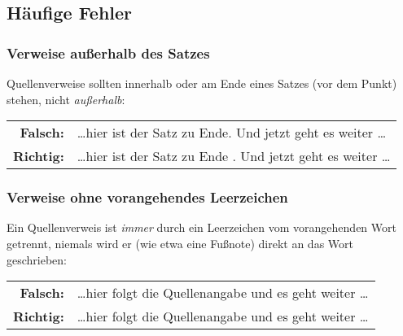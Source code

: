 \subsection{Häufige Fehler}

\subsubsection{Verweise außerhalb des Satzes}
Quellenverweise sollten innerhalb oder am Ende eines Satzes (\dah vor
dem Punkt) stehen, nicht \emph{außerhalb}:
%
\begin{center}
\begin{tabular}{rl}
 \textbf{Falsch:}  & \ldots hier ist der Satz zu Ende. \cite{Oetiker2018} Und jetzt geht es weiter \ldots \\
 \textbf{Richtig:} & \ldots hier ist der Satz zu Ende \cite{Oetiker2018}. Und jetzt geht es weiter \ldots
\end{tabular}
\end{center}

\subsubsection{Verweise ohne vorangehendes Leerzeichen}

Ein Quellenverweis ist \emph{immer} durch ein Leerzeichen vom vorangehenden Wort getrennt, niemals wird er (wie etwa eine Fußnote) direkt an das Wort geschrieben:

\begin{center}
\begin{tabular}{rl}
\textbf{Falsch:}  & \ldots hier folgt die Quellenangabe\cite{Oetiker2018} und es geht weiter \ldots \\
\textbf{Richtig:} & \ldots hier folgt die Quellenangabe \cite{Oetiker2018} und es geht weiter \ldots
\end{tabular}
\end{center}

